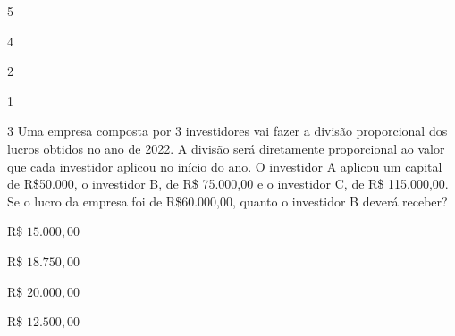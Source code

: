 \begin{multicols}{4}
\begin{escolha}[itemsep=0pt]
\item 5
\item 4
\item 2
\item 1
\end{escolha}
\end{multicols}



\num{3} Uma empresa composta por 3 investidores vai fazer a divisão
proporcional dos lucros obtidos no ano de 2022. A divisão será
diretamente proporcional ao valor que cada investidor aplicou no início
do ano. O investidor A aplicou um capital de R\$50.000, o investidor B,
de R\$ 75.000,00 e o investidor C, de R\$ 115.000,00. Se o lucro da
empresa foi de R\$60.000,00, quanto o investidor B deverá receber?

\begin{multicols}{2}
\begin{escolha}[itemsep=0pt]
\item R\$ $15.000,00$
\item R\$ $18.750,00$
\item R\$ $20.000,00$
\item R\$ $12.500,00$
\end{escolha}
\end{multicols}

